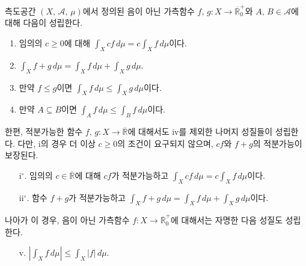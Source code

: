 \begin{theorem}
    측도공간 $(X,\,\mathcal{A},\,\mu)$에서 정의된 음이 아닌 가측함수 $f,\,g:X\to\overline{\mathbb{R}}^+_0$와 $A,\,B\in\mathcal{A}$에 대해 다음이 성립한다.
    \begin{enumerate}
        \item 임의의 $c\geq0$에 대해 $\int_Xcf\,d\mu=c\int_Xf\,d\mu$이다.
        \item $\int_Xf+g\,d\mu=\int_Xf\,d\mu+\int_Xg\,d\mu$.
        \item 만약 $f\leq g$이면 $\int_Xf\,d\mu\leq\int_Xg\,d\mu$이다.
        \item 만약 $A\subseteq B$이면 $\int_Af\,d\mu\leq\int_Bf\,d\mu$이다.
    \end{enumerate}
    한편, 적분가능한 함수 $f,\,g:X\to\overline{\mathbb{R}}$에 대해서도 iv를 제외한 나머지 성질들이 성립한다. 다만, i의 경우 더 이상 $c\geq0$의 조건이 요구되지 않으며, $cf$와 $f+g$의 적분가능이 보장된다.
    \begin{enumerate}
        \item[i$^\circ$.] 임의의 $c\in\overline{\mathbb{R}}$에 대해 $cf$가 적분가능하고 $\int_Xcf\,d\mu=c\int_Xf\,d\mu$이다.
        \item[ii$^\circ$.] 함수 $f+g$가 적분가능하고 $\int_Xf+g\,d\mu=\int_Xf\,d\mu+\int_Xg\,d\mu$이다.\footnotemark
    \end{enumerate}
    나아가 이 경우, 음이 아닌 가측함수 $f:X\to\overline{\mathbb{R}}^+_0$에 대해서는 자명한 다음 성질도 성립한다.
    \begin{enumerate}
        \item[v.] $|\int_Xf\,d\mu|\leq\int_X|f|\,d\mu$.
    \end{enumerate}
\end{theorem}

